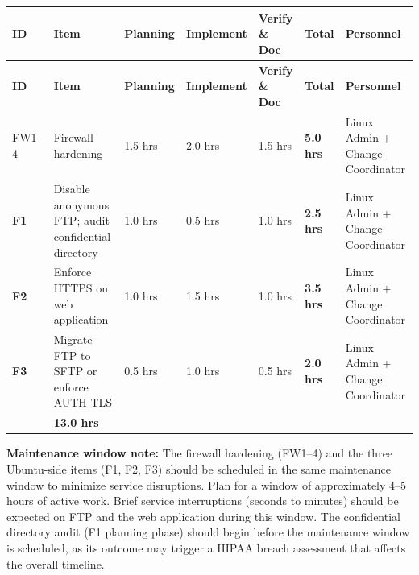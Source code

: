 \documentclass[12pt]{article}
\begin{document}
\newpage
 
\noindent
\begin{longtable}{>{\bfseries}p{1.0cm} p{2.8cm} p{1.4cm} p{1.4cm} p{1.6cm} p{1.4cm} p{2.0cm}}
  \rowcolor{headercol}
  \color{white}\textbf{ID} &
  \color{white}\textbf{Item} &
  \color{white}\textbf{Planning} &
  \color{white}\textbf{Implement} &
  \color{white}\textbf{Verify \& Doc} &
  \color{white}\textbf{Total} &
  \color{white}\textbf{Personnel} \\
  \endfirsthead
  \rowcolor{headercol}
  \color{white}\textbf{ID} &
  \color{white}\textbf{Item} &
  \color{white}\textbf{Planning} &
  \color{white}\textbf{Implement} &
  \color{white}\textbf{Verify \& Doc} &
  \color{white}\textbf{Total} &
  \color{white}\textbf{Personnel} \\
  \endhead
  \midrule
 
  FW1--4 &
  Firewall hardening &
  1.5 hrs &
  2.0 hrs &
  1.5 hrs &
  \textbf{5.0 hrs} &
  Linux Admin + Change Coordinator \\[4pt]
 
  F1 &
  Disable anonymous FTP; audit confidential directory &
  1.0 hrs &
  0.5 hrs &
  1.0 hrs &
  \textbf{2.5 hrs} &
  Linux Admin + Change Coordinator \\[4pt]
 
  F2 &
  Enforce HTTPS on web application &
  1.0 hrs &
  1.5 hrs &
  1.0 hrs &
  \textbf{3.5 hrs} &
  Linux Admin + Change Coordinator \\[4pt]
 
  F3 &
  Migrate FTP to SFTP or enforce AUTH TLS &
  0.5 hrs &
  1.0 hrs &
  0.5 hrs &
  \textbf{2.0 hrs} &
  Linux Admin + Change Coordinator \\[4pt]
 
  \rowcolor{totalrowcol}
  \multicolumn{5}{l}{\textbf{Immediate window total}} &
  \textbf{13.0 hrs} &
  \\[2pt]
 
  \bottomrule
\end{longtable}
 
\begin{impactbox}
\textbf{Maintenance window note:} The firewall hardening (FW1--4) and the
three Ubuntu-side items (F1, F2, F3) should be scheduled in the same
maintenance window to minimize service disruptions. Plan for a window of
approximately 4--5 hours of active work. Brief service interruptions
(seconds to minutes) should be expected on FTP and the web application
during this window. The confidential directory audit (F1 planning phase)
should begin before the maintenance window is scheduled, as its outcome
may trigger a HIPAA breach assessment that affects the overall timeline.
\end{impactbox}
 
\end{document}
